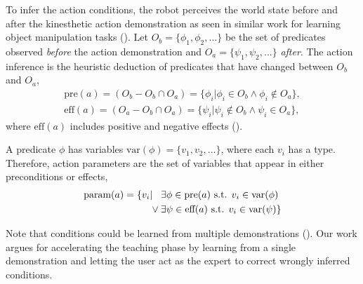 To infer the action conditions, the robot perceives the world state before %
and after the kinesthetic action demonstration as seen in similar work for learning object manipulation tasks (\cite{ahmadzadeh2015learning,she2014teaching}).
Let $O_b = \{\phi_1, \phi_2, ... \}$ be the set of predicates observed \emph{before} the action demonstration and $O_a = \{\psi_1, \psi_2, ... \}$ \emph{after}.
The action inference is the heuristic deduction of predicates that have changed between $O_b$ and $O_a$, \ie
\begin{align*} \text{pre}(a) = (O_b - O_b \cap O_a) = \{\phi_i | \phi_i \in O_b \wedge \phi_i \notin O_a \}, \\
\text{eff}(a) = (O_a - O_b \cap O_a) = \{\psi_i | \psi_i \notin O_b \wedge \psi_i \in O_a \}, 
\end{align*}
where $\text{eff}(a)$ includes positive and negative effects ().

A predicate $\phi$ has variables $\text{var}(\phi) = \{v_1, v_2, \dots\}$, where each $v_i$ has a type.
Therefore, action parameters are the set of variables that appear in either preconditions or effects, \ie
\begin{align*}
     \text{param}(a) = \{v_i &| \hspace{0.3cm}\exists \phi \in \text{pre}(a) \text{ s.t. } v_i \in \text{var}(\phi)\\
     &\lor \exists \psi \in \text{eff}(a) \text{ s.t. } v_i \in \text{var}(\psi) \}
\end{align*}

Note that conditions could be learned from multiple demonstrations (\cite{abdo2013learning,konidaris2018fromSkills}).
Our work argues for accelerating the teaching phase by learning from a single demonstration and letting the user act as the expert to correct wrongly inferred conditions.

